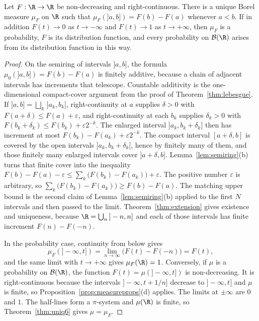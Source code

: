 \begin{theorem}\label{thm:stieltjes}
Let $F:\R\to\R$ be non-decreasing and right-continuous.
There is a unique Borel measure $\mu_F$ on $\R$ such that $\mu_F(]a,b])=F(b)-F(a)$ whenever $a<b$.
If in addition $F(t)\to0$ as $t\to-\infty$ and $F(t)\to1$ as $t\to+\infty$, then $\mu_F$ is a probability, $F$ is its distribution function, and every probability on $\mathcal B(\R)$ arises from its distribution function in this way.
\end{theorem}
\begin{proof}
On the semiring of intervals $]a,b]$, the formula $\mu_0(]a,b])=F(b)-F(a)$ is finitely additive, because a chain of adjacent intervals has increments that telescope.
Countable additivity is the one-dimensional compact-cover argument from the proof of Theorem~\ref{thm:lebesgue}.
If $]a,b]=\bigsqcup_k\,]a_k,b_k]$, right-continuity at $a$ supplies $\delta>0$ with $F(a+\delta)\le F(a)+\varepsilon$, and right-continuity at each $b_k$ supplies $\delta_k>0$ with $F(b_k+\delta_k)\le F(b_k)+\varepsilon 2^{-k}$.
The enlarged interval $]a_k,b_k+\delta_k]$ then has increment at most $F(b_k)-F(a_k)+\varepsilon 2^{-k}$.
The compact interval $[a+\delta,b]$ is covered by the open intervals $]a_k,b_k+\delta_k[$, hence by finitely many of them, and those finitely many enlarged intervals cover $]a+\delta,b]$.
Lemma~\ref{lem:semiring}(b) turns that finite cover into the inequality $F(b)-F(a)-\varepsilon\le\sum_k\bigl(F(b_k)-F(a_k)\bigr)+\varepsilon$.
The positive number $\varepsilon$ is arbitrary, so $\sum_k\bigl(F(b_k)-F(a_k)\bigr)\ge F(b)-F(a)$.
The matching upper bound is the second claim of Lemma~\ref{lem:semiring}(b) applied to the first $N$ intervals and then passed to the limit.
Theorem~\ref{thm:extension} gives existence and uniqueness, because $\R=\bigcup_n\,]-n,n]$ and each of those intervals has finite increment $F(n)-F(-n)$.

In the probability case, continuity from below gives
\[
\mu_F(]-\infty,t])=\lim_{n\to\infty}\bigl(F(t)-F(-n)\bigr)=F(t),
\]
and the same limit with $t\to+\infty$ gives $\mu_F(\R)=1$.
Conversely, if $\mu$ is a probability on $\mathcal B(\R)$, the function $F(t)=\mu(]-\infty,t])$ is non-decreasing.
It is right-continuous because the intervals $]-\infty,t+1/n]$ decrease to $]-\infty,t]$ and $\mu$ is finite, so Proposition~\ref{prop:measureprops}(d) applies.
The limits at $\pm\infty$ are $0$ and $1$.
The half-lines form a $\pi$-system and $\mu(\R)$ is finite, so Theorem~\ref{thm:uniq6} gives $\mu=\mu_F$.
\end{proof}

